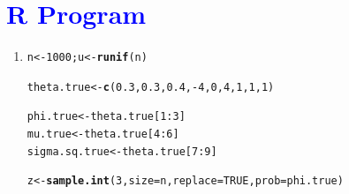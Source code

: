 \documentclass[11pt, a4paper]{article}\usepackage[]{graphicx}\usepackage[]{xcolor}
\makeatletter
\newcommand{\hlnum}[1]{\textcolor[rgb]{0.686,0.059,0.569}{#1}}%
\newcommand{\hlopt}[1]{\textcolor[rgb]{0,0,0}{#1}}%
\newcommand{\hldef}[1]{\textcolor[rgb]{0.345,0.345,0.345}{#1}}%
\newcommand{\hlkwb}[1]{\textcolor[rgb]{0.69,0.353,0.396}{#1}}%
\newcommand{\hlkwc}[1]{\textcolor[rgb]{0.333,0.667,0.333}{#1}}%
\newcommand{\hlkwd}[1]{\textcolor[rgb]{0.737,0.353,0.396}{\textbf{#1}}}%
\newenvironment{kframe}{%
 \def\at@end@of@kframe{}%
 \ifinner\ifhmode%
  \def\at@end@of@kframe{\end{minipage}}%
  \begin{minipage}{\columnwidth}%
 \fi\fi%
 \def\FrameCommand##1{\hskip\@totalleftmargin \hskip-\fboxsep
 \colorbox{shadecolor}{##1}\hskip-\fboxsep
     \hskip-\linewidth \hskip-\@totalleftmargin \hskip\columnwidth}%
 \MakeFramed {\advance\hsize-\width
   \@totalleftmargin\z@ \linewidth\hsize
   \@setminipage}}%
 {\par\unskip\endMakeFramed%
 \at@end@of@kframe}
\newenvironment{knitrout}{}{} %
\makeatother
\begin{document}
\section*{\faArrowAltCircleRight[regular] \textcolor{blue}{R Program}}






\begin{enumerate}

\item[\scalebox{2.0}{\twemoji{keycap: 1}}]

\begin{knitrout}
\color{fgcolor}\begin{kframe}
\begin{alltt}
\hldef{n} \hlkwb{<-} \hlnum{1000}\hldef{; u} \hlkwb{<-} \hlkwd{runif}\hldef{(n)}
\end{alltt}
\end{kframe}
\end{knitrout}

\begin{knitrout}
\color{fgcolor}\begin{kframe}
\begin{alltt}
\hldef{theta.true} \hlkwb{<-} \hlkwd{c}\hldef{(}\hlnum{0.3}\hldef{,} \hlnum{0.3}\hldef{,} \hlnum{0.4}\hldef{,} \hlopt{-}\hlnum{4}\hldef{,} \hlnum{0}\hldef{,} \hlnum{4}\hldef{,} \hlnum{1}\hldef{,} \hlnum{1}\hldef{,} \hlnum{1}\hldef{)}

\hldef{phi.true} \hlkwb{<-} \hldef{theta.true[}\hlnum{1}\hlopt{:}\hlnum{3}\hldef{]}
\hldef{mu.true} \hlkwb{<-} \hldef{theta.true[}\hlnum{4}\hlopt{:}\hlnum{6}\hldef{]}
\hldef{sigma.sq.true} \hlkwb{<-} \hldef{theta.true[}\hlnum{7}\hlopt{:}\hlnum{9}\hldef{]}
\end{alltt}
\end{kframe}
\end{knitrout}

\begin{knitrout}
\color{fgcolor}\begin{kframe}
\begin{alltt}
\hldef{z} \hlkwb{<-} \hlkwd{sample.int}\hldef{(}\hlnum{3}\hldef{,} \hlkwc{size} \hldef{= n,} \hlkwc{replace} \hldef{=} \hlnum{TRUE}\hldef{,} \hlkwc{prob} \hldef{= phi.true)}
\end{alltt}
\end{kframe}
\end{knitrout}


\end{enumerate}
\end{document}
